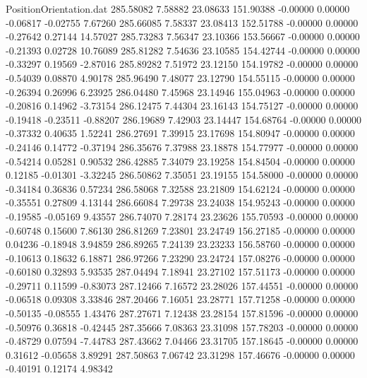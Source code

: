 \begin{filecontents}{PositionOrientation.dat}
 285.58082    7.58882   23.08633   151.90388   -0.00000    0.00000   -0.06817   -0.02755    7.67260
 285.66085    7.58337   23.08413   152.51788   -0.00000    0.00000   -0.27642    0.27144   14.57027
 285.73283    7.56347   23.10366   153.56667   -0.00000    0.00000   -0.21393    0.02728   10.76089
 285.81282    7.54636   23.10585   154.42744   -0.00000    0.00000   -0.33297    0.19569   -2.87016
 285.89282    7.51972   23.12150   154.19782   -0.00000    0.00000   -0.54039    0.08870    4.90178
 285.96490    7.48077   23.12790   154.55115   -0.00000    0.00000   -0.26394    0.26996    6.23925
 286.04480    7.45968   23.14946   155.04963   -0.00000    0.00000   -0.20816    0.14962   -3.73154
 286.12475    7.44304   23.16143   154.75127   -0.00000    0.00000   -0.19418   -0.23511   -0.88207
 286.19689    7.42903   23.14447   154.68764   -0.00000    0.00000   -0.37332    0.40635    1.52241
 286.27691    7.39915   23.17698   154.80947   -0.00000    0.00000   -0.24146    0.14772   -0.37194
 286.35676    7.37988   23.18878   154.77977   -0.00000    0.00000   -0.54214    0.05281    0.90532
 286.42885    7.34079   23.19258   154.84504   -0.00000    0.00000    0.12185   -0.01301   -3.32245
 286.50862    7.35051   23.19155   154.58000   -0.00000    0.00000   -0.34184    0.36836    0.57234
 286.58068    7.32588   23.21809   154.62124   -0.00000    0.00000   -0.35551    0.27809    4.13144
 286.66084    7.29738   23.24038   154.95243   -0.00000    0.00000   -0.19585   -0.05169    9.43557
 286.74070    7.28174   23.23626   155.70593   -0.00000    0.00000   -0.60748    0.15600    7.86130
 286.81269    7.23801   23.24749   156.27185   -0.00000    0.00000    0.04236   -0.18948    3.94859
 286.89265    7.24139   23.23233   156.58760   -0.00000    0.00000   -0.10613    0.18632    6.18871
 286.97266    7.23290   23.24724   157.08276   -0.00000    0.00000   -0.60180    0.32893    5.93535
 287.04494    7.18941   23.27102   157.51173   -0.00000    0.00000   -0.29711    0.11599   -0.83073
 287.12466    7.16572   23.28026   157.44551   -0.00000    0.00000   -0.06518    0.09308    3.33846
 287.20466    7.16051   23.28771   157.71258   -0.00000    0.00000   -0.50135   -0.08555    1.43476
 287.27671    7.12438   23.28154   157.81596   -0.00000    0.00000   -0.50976    0.36818   -0.42445
 287.35666    7.08363   23.31098   157.78203   -0.00000    0.00000   -0.48729    0.07594   -7.44783
 287.43662    7.04466   23.31705   157.18645   -0.00000    0.00000    0.31612   -0.05658    3.89291
 287.50863    7.06742   23.31298   157.46676   -0.00000    0.00000   -0.40191    0.12174    4.98342

\end{filecontents}
